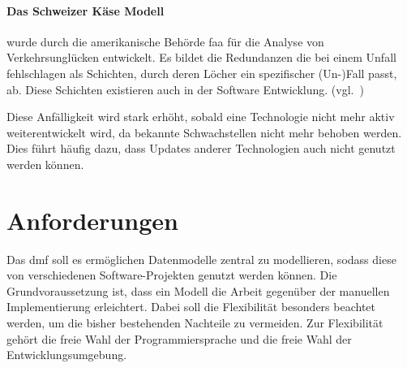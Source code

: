 \documentclass[./einleitung.tex]{subfiles}
\begin{document}
\begin{enumerate}
\begin{center}
    \paragraph{Das Schweizer Käse Modell} wurde durch die amerikanische Behörde \acrshort{faa} für die Analyse von Verkehrsunglücken entwickelt.
    Es bildet die Redundanzen die bei einem Unfall fehlschlagen als Schichten, durch deren Löcher ein spezifischer (Un-)Fall passt, ab.
    Diese Schichten existieren auch in der Software Entwicklung. (vgl.~\cite{bergeon2009swiss})
\end{center}
Diese Anfälligkeit wird stark erhöht, sobald eine Technologie nicht mehr aktiv weiterentwickelt wird, da bekannte Schwachstellen nicht mehr behoben werden.
Dies führt häufig dazu, dass Updates anderer Technologien auch nicht genutzt werden können.
\end{enumerate}
\section{Anforderungen}\label{sec:aufgabenstellung}
Das \acrfull{dmf} soll es ermöglichen Datenmodelle zentral zu modellieren, sodass diese von verschiedenen Software-Projekten genutzt werden können.
Die Grundvoraussetzung ist, dass ein Modell die Arbeit gegenüber der manuellen Implementierung erleichtert.
Dabei soll die Flexibilität besonders beachtet werden, um die bisher bestehenden Nachteile zu vermeiden.
Zur Flexibilität gehört die freie Wahl der Programmiersprache und die freie Wahl der Entwicklungsumgebung.
\end{document}
